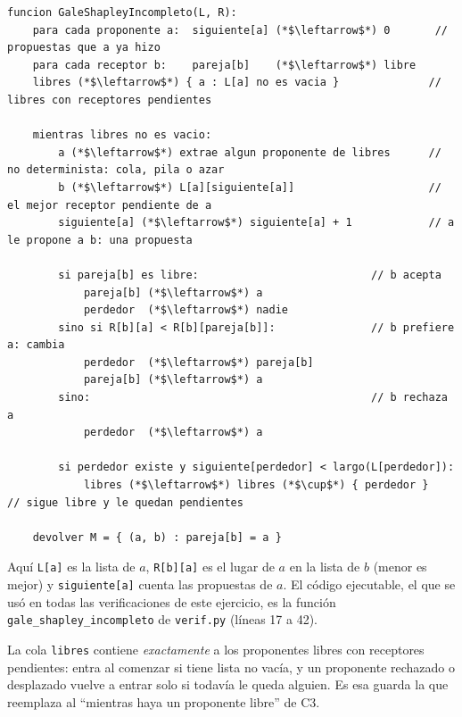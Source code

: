 \documentclass[11pt]{article}
\begin{document}
\begin{lstlisting}[style=pseudo]
funcion GaleShapleyIncompleto(L, R):
    para cada proponente a:  siguiente[a] (*$\leftarrow$*) 0       // propuestas que a ya hizo
    para cada receptor b:    pareja[b]    (*$\leftarrow$*) libre
    libres (*$\leftarrow$*) { a : L[a] no es vacia }              // libres con receptores pendientes

    mientras libres no es vacio:
        a (*$\leftarrow$*) extrae algun proponente de libres      // no determinista: cola, pila o azar
        b (*$\leftarrow$*) L[a][siguiente[a]]                     // el mejor receptor pendiente de a
        siguiente[a] (*$\leftarrow$*) siguiente[a] + 1            // a le propone a b: una propuesta

        si pareja[b] es libre:                           // b acepta
            pareja[b] (*$\leftarrow$*) a
            perdedor  (*$\leftarrow$*) nadie
        sino si R[b][a] < R[b][pareja[b]]:               // b prefiere a: cambia
            perdedor  (*$\leftarrow$*) pareja[b]
            pareja[b] (*$\leftarrow$*) a
        sino:                                            // b rechaza a
            perdedor  (*$\leftarrow$*) a

        si perdedor existe y siguiente[perdedor] < largo(L[perdedor]):
            libres (*$\leftarrow$*) libres (*$\cup$*) { perdedor }   // sigue libre y le quedan pendientes

    devolver M = { (a, b) : pareja[b] = a }
\end{lstlisting}
Aquí \texttt{L[a]} es la lista de $a$, \texttt{R[b][a]} es el lugar de $a$ en la lista de $b$ (menor es mejor)
y \texttt{siguiente[a]} cuenta las propuestas de $a$. El código ejecutable, el que se usó en todas las
verificaciones de este ejercicio, es la función \texttt{gale\_shapley\_incompleto} de \texttt{verif.py}
(líneas 17 a 42).

La cola \texttt{libres} contiene \emph{exactamente} a los proponentes libres con receptores pendientes: entra
al comenzar si tiene lista no vacía, y un proponente rechazado o desplazado vuelve a entrar solo si todavía le
queda alguien. Es esa guarda la que reemplaza al ``mientras haya un proponente libre'' de C3.
\end{document}
